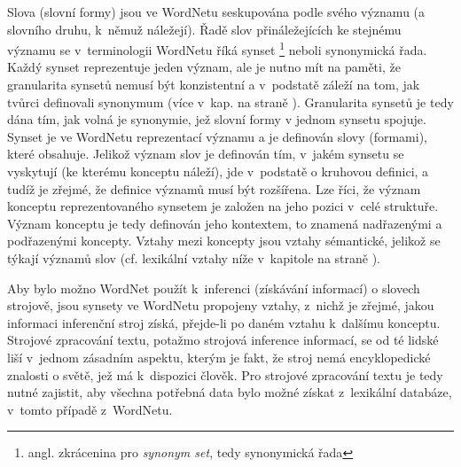 \documentclass[a4paper, 11pt, oneside, showtrims]{book}
\newcommand{\itNameRef}[1]{\textit{\nameref{#1}}}
\begin{document}
					Slova (slovní formy) jsou ve WordNetu seskupována podle svého významu (a slovního druhu, k~němuž náležejí). Řadě slov přináležejících ke stejnému významu se v~terminologii WordNetu říká synset \footnote{angl. zkrácenina pro \textit{synonym set}, tedy synonymická řada} neboli synonymická řada. Každý synset reprezentuje jeden význam, ale je nutno mít na paměti, že granularita synsetů nemusí být konzistentní a v~podstatě záleží na tom, jak tvůrci definovali synonymum (více v~kap. \itNameRef{cha:synon} na straně \pageref{cha:synon}). Granularita synsetů je tedy dána tím, jak volná je synonymie, jež slovní formy v jednom synsetu spojuje. Synset je ve WordNetu reprezentací významu a je definován slovy (formami), které obsahuje. Jelikož význam slov je definován tím, v~jakém synsetu se vyskytují (ke kterému konceptu náleží), jde v~podstatě o kruhovou definici, a tudíž je zřejmé, že definice významů musí být rozšířena. Lze říci, že význam konceptu reprezentovaného synsetem je založen na jeho pozici v~celé struktuře. Význam konceptu je tedy definován jeho kontextem, to znamená nadřazenými a podřazenými koncepty. \parencite{kamps2002visualizing} Vztahy mezi koncepty jsou vztahy sémantické, jelikož se týkají významů slov (cf. lexikální vztahy níže v~kapitole \itNameRef{cha:lexvztah} na straně \pageref{cha:lexvztah}). 

					Aby bylo možno WordNet použít k~inferenci (získávání informací) o slovech strojově, jsou synsety ve WordNetu propojeny vztahy, z~nichž je zřejmé, jakou informaci inferenční stroj získá, přejde-li po daném vztahu k~dalšímu konceptu. Strojové zpracování textu, potažmo strojová inference informací, se od té lidské liší v~jednom zásadním aspektu, kterým je fakt, že stroj nemá encyklopedické znalosti o světě, jež má k~dispozici člověk. Pro strojové zpracování textu je tedy nutné zajistit, aby všechna potřebná data bylo možné získat z~lexikální databáze, v~tomto případě z~WordNetu.
\end{document}
